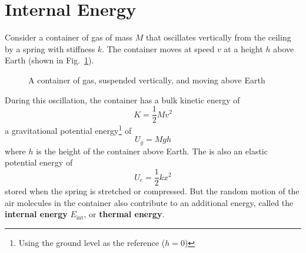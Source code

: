 \section{Internal Energy}
Consider a container of gas of mass $M$ that oscillates vertically from the
ceiling by a spring with stiffness $k$. The container moves at speed $v$ at a
height $h$ above Earth (shown in Fig.~\ref{fig:gas}).
\begin{figure}[ht]
  \centering
  \caption{A container of gas, suspended vertically, and moving above Earth}
  \label{fig:gas}
\end{figure}
During this oscillation, the container has a bulk kinetic energy of
\begin{equation*}
  K=\dfrac12 Mv^2
\end{equation*}
a gravitational potential energy\footnote{Using the ground level as the
reference ($h=0$)} of
\begin{equation*}
  U_g=Mgh
\end{equation*}
where $h$ is the height of the container above Earth. The is also an elastic
potential energy of
\begin{equation*}
  U_e=\frac12kx^2
\end{equation*}
stored when the spring is stretched or compressed. But the random motion of
the air molecules in the container also contribute to an additional energy,
called the \textbf{internal energy} $E_\text{int}$, or \textbf{thermal energy}.


